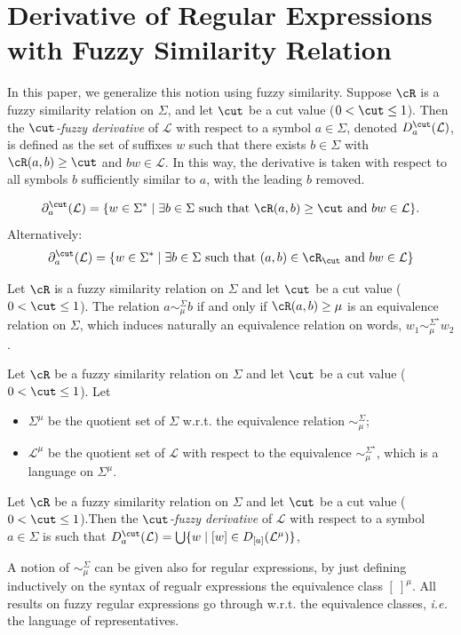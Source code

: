 \section{Derivative of Regular Expressions with Fuzzy Similarity Relation}\label{sec:fuzzy-derivatives}
In this paper, we generalize this notion using fuzzy similarity. Suppose $\cR$ is a fuzzy similarity relation on $\Sigma$, and let $\cut$ be a cut value ($0 < \cut \le 1$). Then the \emph{$\cut$-fuzzy derivative} of $\mathcal{L}$ with respect to a symbol $a \in \Sigma$, denoted $D_a^\cut(\mathcal{L})$, is defined as the set of suffixes $w$ such that there exists $b \in \Sigma$ with $\cR(a,b) \ge \cut$ and $bw \in \mathcal{L}$. In this way, the derivative is taken with respect to all symbols $b$ sufficiently similar to $a$, with the leading $b$ removed.

\begin{definition}\label{fuzzyderivative}
$$
\partial_a^\cut(\mathcal{L}) = \{w \in \Sigma^* \mid \exists b \in \Sigma\ \text{such that}\ \cR(a,b) \ge \cut\ \text{and}\ bw \in \mathcal{L}\}.
$$
Alternatively:
$$
\partial_a^\cut(\mathcal{L}) = \{w \in \Sigma^* \mid \exists b \in \Sigma\ \text{such that}\ (a, b) \in \cR_\cut\ \text{and}\ bw \in \mathcal{L}\}
$$
\end{definition}

{\color{blue}
\begin{proposition}
Let $\cR$ is a fuzzy similarity relation on $\Sigma$ and let $\cut$ be a cut value ($0 < \cut \le 1$). The relation $a\sim_\mu^\Sigma b$ if and only if $\cR(a,b)\geq \mu$ is an equivalence relation on $\Sigma$, which induces naturally an equivalence relation on words, $w_1\sim_\mu^{\Sigma^\star} w_2$.
\end{proposition}

\begin{definition}Let $\cR$ be a fuzzy similarity relation on $\Sigma$ and let $\cut$ be a cut value ($0 < \cut \le 1$). Let \begin{itemize}
\item $\Sigma^\mu$ be the quotient set of $\Sigma$ w.r.t. the equivalence relation $\sim_\mu^\Sigma$;
\item $\mathcal L^\mu$ be the quotient set of $\mathcal L$ with respect to the equivalence  $\sim_\mu^{\Sigma^\star}$, which is a language on $\Sigma^\mu$.
\end{itemize}
\end{definition}

\begin{theorem}Let $\cR$ be a fuzzy similarity relation on $\Sigma$ and let $\cut$ be a cut value ($0 < \cut \le 1$).Then the \emph{$\cut$-fuzzy derivative} of $\mathcal{L}$ with respect to a symbol $a \in \Sigma$ is such that  $D_a^\cut(\mathcal{L})=\bigcup\{w \mid  [w]\in D_{[a]}(\mathcal L^\mu) \}$,
\end{theorem}

A notion of $\sim_\mu^\Sigma$ can be given also for regular expressions, by just defining inductively on the syntax of regualr expressions the equivalence class $[\ ]^\mu$. All results on fuzzy regular expressions go through w.r.t. the equivalence classes, {\em i.e.} the language of representatives.}

